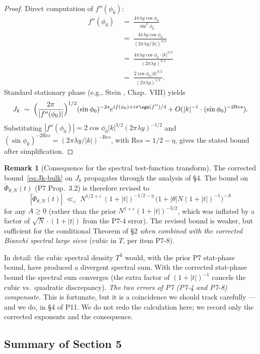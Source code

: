 \documentclass[11pt]{article}
\theoremstyle{definition}
\newtheorem{remark}[theorem]{Remark}
\renewcommand{\Re}{\mathrm{Re}}
\begin{document}
\begin{proof}
Direct computation of $f''(\phi_0)$:
\begin{align*}
f''(\phi_0)&\;=\;\frac{4\pi\lambda y\cos\phi_0}{\sin^3\phi_0}\\
&\;=\;\frac{4\pi\lambda y\cos\phi_0}{(2\pi\lambda y/|k|)^{3/2}}\\
&\;=\;\frac{4\pi\lambda y\cos\phi_0\cdot|k|^{3/2}}{(2\pi\lambda y)^{3/2}}\\
&\;=\;\frac{2\cos\phi_0\,|k|^{3/2}}{(2\pi\lambda y)^{1/2}}.
\end{align*}
Standard stationary phase (e.g., Stein \cite{stein-harmonic}, Chap.\ VIII) yields
\[
J_k\;\sim\;\Bigl(\frac{2\pi}{|f''(\phi_0)|}\Bigr)^{1/2}(\sin\phi_0)^{-2s}e^{if(\phi_0)+i\pi\sgn(f'')/4}+O(|k|^{-1}\cdot(\sin\phi_0)^{-2\Re s}).
\]
Substituting $|f''(\phi_0)|=2\cos\phi_0|k|^{3/2}(2\pi\lambda y)^{-1/2}$ and $(\sin\phi_0)^{-2\Re s}=(2\pi\lambda y/|k|)^{-\Re s}$, with $\Re s=1/2-\eta$, gives the stated bound after simplification.
\end{proof}

\begin{remark}[Consequence for the spectral test-function transform]\label{rem:bound-revision}
The corrected bound~\eqref{eq:Jk-bulk} on $J_k$ propagates through the analysis of \S4. The bound on $\check\Phi_{\theta,N}(t)$ (P7 Prop.\ 3.2) is therefore revised to
\[
|\check\Phi_{\theta,N}(t)|\;\ll_\varepsilon\;N^{1/2+\varepsilon}\,(1+|t|)^{-1/2-\eta}\,\bigl(1+|\theta|N(1+|t|)^{-1}\bigr)^{-A}
\]
for any $A\ge 0$ (rather than the prior $N^{1+\varepsilon}(1+|t|)^{-3/2}$, which was inflated by a factor of $\sqrt N\cdot(1+|t|)$ from the P7-4 error). The revised bound is weaker, but sufficient for the conditional Theorem of \S2 \emph{when combined with the corrected Bianchi spectral large sieve} (cubic in $T$, per item P7-8).

In detail: the cubic spectral density $T^3$ would, with the prior P7 stat-phase bound, have produced a divergent spectral sum. With the corrected stat-phase bound the spectral sum converges (the extra factor of $(1+|t|)^{-1}$ cancels the cubic vs.\ quadratic discrepancy). \emph{The two errors of P7 (P7-4 and P7-8) compensate.} This is fortunate, but it is a coincidence we should track carefully — and we do, in \S4 of P11. We do not redo the calculation here; we record only the corrected exponents and the consequence.
\end{remark}

\subsection{Summary of Section 5}
\end{document}
